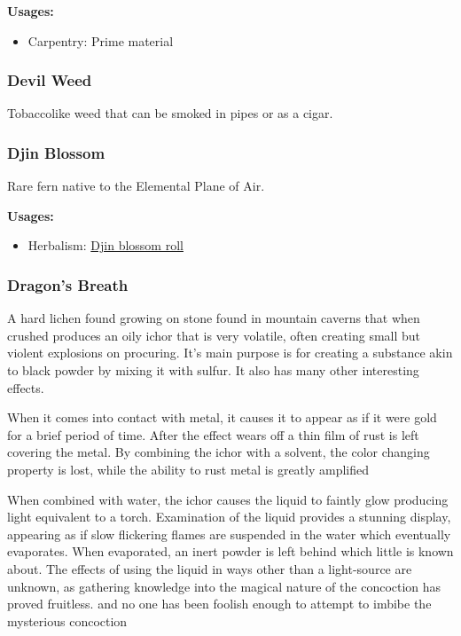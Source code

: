 \vspace{5mm}

\textbf{Usages:}

\begin{itemize}[noitemsep]
\item[] Carpentry: Prime material
\end{itemize}

\subsubsection{Devil Weed}

Tobaccolike weed that can be smoked in pipes or as a cigar.

\subsubsection{Djin Blossom}
\label{Djin Blossom}

Rare fern native to the Elemental Plane of Air.

\vspace{5mm}

\textbf{Usages:}

\begin{itemize}[noitemsep]
\item[] Herbalism: \hyperref[Djin blossom roll]{Djin blossom roll}
\end{itemize}

\subsubsection{Dragon's Breath}
\label{dragons_breath}

A hard lichen found growing on stone found in mountain caverns that when crushed produces an oily ichor that is very volatile, often creating small but violent explosions on procuring. It's main purpose is for creating a substance akin to black powder by mixing it with sulfur. It also has many other interesting effects.

When it comes into contact with metal, it causes it to appear as if it were gold for a brief period of time. After the effect wears off a thin film of rust is left covering the metal. By combining the ichor with a solvent, the color changing property is lost, while the ability to rust metal is greatly amplified

When combined with water, the ichor causes the liquid to faintly glow producing light equivalent to a torch. Examination of the liquid provides a stunning display, appearing as if slow flickering flames are suspended in the water which eventually evaporates. When evaporated, an inert powder is left behind which little is known about. The effects of using the liquid in ways other than a light-source are unknown, as gathering knowledge into the magical nature of the concoction has proved fruitless. and no one has been foolish enough to attempt to imbibe the mysterious concoction

